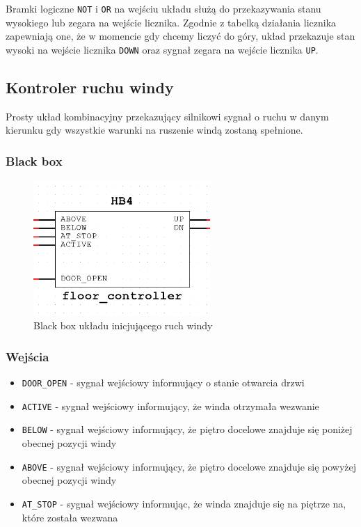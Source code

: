 \documentclass[a4paper]{article}
\begin{document}
Bramki logiczne \verb|NOT| i \verb|OR| na wejściu układu służą do przekazywania stanu wysokiego 
lub zegara na wejście licznika. Zgodnie z tabelką działania licznika zapewniają one, że 
w momencie gdy chcemy liczyć do góry, układ przekazuje stan wysoki na wejście licznika \verb|DOWN|
oraz sygnał zegara na wejście licznika \verb|UP|.

\pagebreak

\subsection{Kontroler ruchu windy}

Prosty układ kombinacyjny przekazujący silnikowi sygnał o ruchu w danym kierunku gdy wszystkie warunki
na ruszenie windą zostaną spełnione.

\subsubsection{Black box}
\begin{figure}[H]
    \centering
    \includegraphics[width=0.6\textwidth]{floor_controller.png}
    \caption{Black box układu inicjującego ruch windy}
\end{figure}

\subsubsection{Wejścia}
\begin{itemize}
    \item \verb|DOOR_OPEN| - sygnał wejściowy informujący o stanie otwarcia drzwi
    \item \verb|ACTIVE| - sygnał wejściowy informujący, że winda otrzymała wezwanie
    \item \verb|BELOW| - sygnał wejściowy informujący, że piętro docelowe znajduje się poniżej obecnej pozycji windy
    \item \verb|ABOVE| - sygnał wejściowy informujący, że piętro docelowe znajduje się powyżej obecnej pozycji windy
    \item \verb|AT_STOP| - sygnał wejściowy informując, że winda znajduje się na piętrze na, które została wezwana
\end{itemize}
\end{document}
